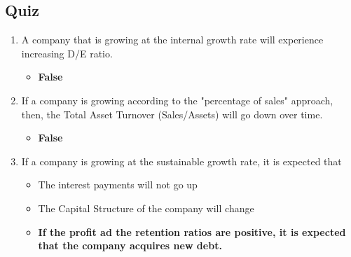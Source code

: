 \begin{tiny}
  \subsection{Quiz}
  \begin{enumerate}[itemsep=-0.5em]
    \item A company that is growing at the internal growth rate will experience increasing D/E ratio.
          \begin{itemize}[itemsep=-0.2em]
            \item \textbf{False}
          \end{itemize}
    \item If a company is growing according to the "percentage of sales" approach, then, the Total Asset Turnover (Sales/Assets) will go down over time.
          \begin{itemize}[itemsep=-0.2em]
            \item \textbf{False}
          \end{itemize}
    \item If a company is growing at the sustainable growth rate, it is expected that
          \begin{itemize}[itemsep=-0.2em]
            \item The interest payments will not go up
            \item The Capital Structure of the company will change
            \item \textbf{If the profit ad the retention ratios are positive, it is expected that the company acquires new debt.}
          \end{itemize}
  \end{enumerate}

\end{tiny}
